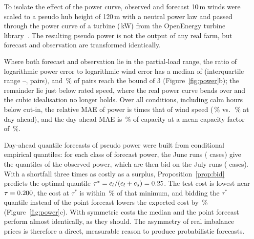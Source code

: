 To isolate the effect of the power curve, observed and forecast 10\,m winds were scaled to a pseudo hub height of 120\,m with a neutral power law and passed through the power curve of a \valTurbine{} turbine (\valRatedKw\,kW) from the OpenEnergy turbine library~\cite{windpowerlib}. The resulting pseudo power is not the output of any real farm, but forecast and observation are transformed identically.

 Where both forecast and observation lie in the partial-load range, the ratio of logarithmic power error to logarithmic wind error has a median of \valElasticityMedian{} (interquartile range \valElasticityQOne--\valElasticityQThree, \valElasticityN{} pairs), and \valElasticityShareAboveThree\,\% of pairs reach the bound of 3 (Figure~\ref{fig:power}b); the remainder lie just below rated speed, where the real power curve bends over and the cubic idealisation no longer holds. Over all conditions, including calm hours below cut-in, the relative MAE of power is \valAmplificationDA{} times that of wind speed (\valRelPowerErrDA\,\% vs.\ \valRelWindErrDA\,\% at day-ahead), and the day-ahead MAE is \valPowerMaeDA\,\% of capacity at a mean capacity factor of \valCapFactorObs\,\%.

 Day-ahead quantile forecasts of pseudo power were built from conditional empirical quantiles: for each class of forecast power, the June runs (\valBidTrainN{} cases) give the quantiles of the observed power, which are then bid on the July runs (\valBidTestN{} cases). With a shortfall three times as costly as a surplus, Proposition~\ref{prop:bid} predicts the optimal quantile $\tau^*=c_l/(c_l+c_s)=0.25$. The test cost is lowest near $\tau=0.200$, the cost at $\tau^*$ is within \valCostStarAboveBestPct\,\% of that minimum, and bidding the $\tau^*$ quantile instead of the point forecast lowers the expected cost by \valCostSavingPct\,\% (Figure~\ref{fig:power}c). With symmetric costs the median and the point forecast perform almost identically, as they should. The asymmetry of real imbalance prices is therefore a direct, measurable reason to produce probabilistic forecasts.
